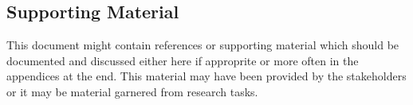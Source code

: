 \subsection {Supporting Material}
This document might contain references or supporting material which should be documented 
and discussed  either here if approprite or more often in the appendices at the end.  This material may have been provided by the stakeholders  
or it may be material garnered from research tasks.